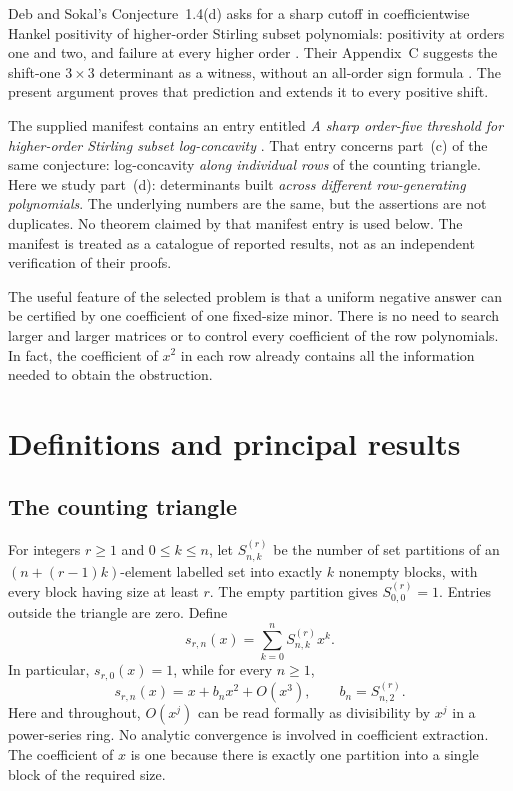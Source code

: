 \documentclass[11pt,a4paper]{article}
\theoremstyle{definition}
\numberwithin{equation}{section}
\begin{document}
Deb and Sokal's Conjecture~1.4(d) asks for a sharp cutoff in coefficientwise
Hankel positivity of higher-order Stirling subset polynomials: positivity
at orders one and two, and failure at every higher order
\cite[Conjecture~1.4(d), p.~10]{DebSokal}. Their Appendix~C suggests the
shift-one $3\times3$ determinant as a witness, without an all-order sign
formula \cite[p.~50]{DebSokal}. The present argument proves that prediction
and extends it to every positive shift.

The supplied manifest contains an entry entitled \emph{A sharp order-five
threshold for higher-order Stirling subset log-concavity}
\cite{Manifest}. That entry concerns part~(c) of the same conjecture:
log-concavity \emph{along individual rows} of the counting triangle. Here
we study part~(d): determinants built \emph{across different row-generating
polynomials}. The underlying numbers are the same, but the assertions are
not duplicates. No theorem claimed by that manifest entry is used below.
The manifest is treated as a catalogue of reported results, not as an
independent verification of their proofs.

The useful feature of the selected problem is that a uniform negative
answer can be certified by one coefficient of one fixed-size minor.
There is no need to search larger and larger matrices or to control every
coefficient of the row polynomials. In fact, the coefficient of $x^2$ in
each row already contains all the information needed to obtain the
obstruction.

\section{Definitions and principal results}
\label{sec:definitions}

\subsection{The counting triangle}

For integers $r\ge1$ and $0\le k\le n$, let $S^{(r)}_{n,k}$ be the number
of set partitions of an $(n+(r-1)k)$-element labelled set into exactly $k$
nonempty blocks, with every block having size at least $r$. The empty
partition gives $S^{(r)}_{0,0}=1$. Entries outside the triangle are zero.
Define
\begin{equation}
 s_{r,n}(x)=\sum_{k=0}^{n}S^{(r)}_{n,k}x^k.
 \label{eq:rows}
\end{equation}
In particular, $s_{r,0}(x)=1$, while for every $n\ge1$,
\begin{equation}
 s_{r,n}(x)=x+b_nx^2+O(x^3),\qquad b_n=S^{(r)}_{n,2}.
 \label{eq:smallx}
\end{equation}
Here and throughout, $O(x^j)$ can be read formally as divisibility by
$x^j$ in a power-series ring. No analytic convergence is involved in
coefficient extraction. The coefficient of $x$ is one because there is
exactly one partition into a single block of the required size.
\end{document}
